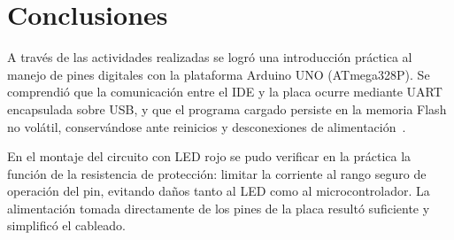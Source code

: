 \documentclass[11pt,a4paper]{article}
\begin{document}
                                                                                                           \newpage
                                                                                                           \section*{Conclusiones}

                                                                                                           A trav\'es de las actividades realizadas se logr\'o una introducci\'on pr\'actica al manejo
                                                                                                           de pines digitales con la plataforma Arduino UNO (ATmega328P). Se comprendi\'o que la
                                                                                                           comunicaci\'on entre el IDE y la placa ocurre mediante UART encapsulada sobre USB, y que
                                                                                                           el programa cargado persiste en la memoria Flash no vol\'atil, conserv\'andose ante reinicios
                                                                                                           y desconexiones de alimentaci\'on~\cite{unoboard,atmega328,arduinoref}.

                                                                                                           En el montaje del circuito con LED rojo se pudo verificar en la pr\'actica la funci\'on de
                                                                                                           la resistencia de protecci\'on: limitar la corriente al rango seguro de operaci\'on del pin,
                                                                                                           evitando da\~nos tanto al LED como al microcontrolador. La alimentaci\'on tomada directamente
                                                                                                           de los pines de la placa result\'o suficiente y simplific\'o el cableado.
\end{document}
